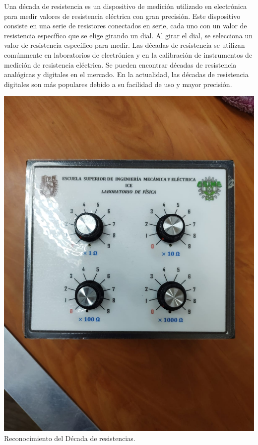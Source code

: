 \documentclass[10pt]{article}
\begin{document}
\begin{multicols}{2}
Una década de resistencia es un dispositivo de medición utilizado en electrónica para medir valores de resistencia eléctrica con gran precisión. Este dispositivo consiste en una serie de resistores conectados en serie, cada uno con un valor de resistencia específico que se elige girando un dial. Al girar el dial, se selecciona un valor de resistencia específico para medir. Las décadas de resistencia se utilizan comúnmente en laboratorios de electrónica y en la calibración de instrumentos de medición de resistencia eléctrica. Se pueden encontrar décadas de resistencia analógicas y digitales en el mercado. En la actualidad, las décadas de resistencia digitales son más populares debido a su facilidad de uso y mayor precisión.

\begin{center}
\includegraphics[scale=0.1]{Decada}\\
Reconocimiento del Década de resistencias.
\begin{enumerate}

\end{enumerate}
\end{center}
\end{multicols}
\end{document}
